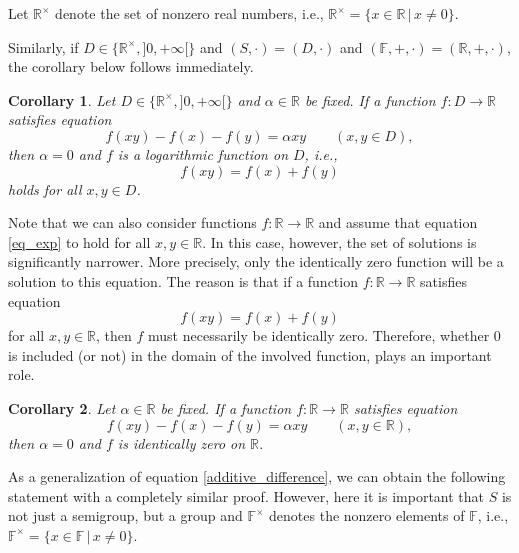 \documentclass[a4paper,12pt]{article}
\theoremstyle{plain}
\newtheorem{cor}{Corollary}
\theoremstyle{definition}
\theoremstyle{remark}
\begin{document}
Let $\mathbb{R}^{\times}$ denote the set of nonzero real numbers, i.e., 
$\mathbb{R}^{\times}= \{ x\in \mathbb{R}\, \vert \, x\neq 0\}$. 


Similarly, if $D\in \{\mathbb{R}^{\times}, ]0, +\infty[ \}$  and  $(S, \cdot)= (D, \cdot)$ and $(\mathbb{F},+, \cdot)= (\mathbb{R},+, \cdot )$, the corollary below follows immediately. 

\begin{cor}\label{cor_exp_positive}
 Let $D\in \{\mathbb{R}^{\times}, ]0, +\infty[ \}$ and  $\alpha\in \mathbb{R}$ be fixed. If a function $f\colon D\to \mathbb{R}$ satisfies equation 
 \begin{equation}\label{eq_exp}
  f(xy)-f(x)-f(y)= \alpha xy
  \qquad 
  (x, y \in D), 
 \end{equation}
 then $\alpha=0$ and $f$ is a logarithmic function on $D$, i.e., 
\[
 f(xy)= f(x)+f(y)
\]
holds for all $x, y\in D$. 
\end{cor}

Note that we can also consider functions $f\colon \mathbb{R}\to \mathbb{R}$ and assume that equation \eqref{eq_exp} to hold for all $x, y\in \mathbb{R}$. 
In this case, however, the set of solutions is significantly narrower. More precisely, only the identically zero function will be a solution to this equation. The reason is that if a function $f\colon \mathbb{R}\to \mathbb{R}$ satisfies  equation
\[
 f(xy)= f(x)+f(y)
\]
for all $x, y\in \mathbb{R}$, then $f$ must necessarily be identically zero. Therefore, whether $0$ is included (or not) in the domain of the involved function, plays an important role.

\begin{cor}\label{cor_exp_real}
 Let $\alpha\in \mathbb{R}$ be fixed. If a function $f\colon \mathbb{R}\to \mathbb{R}$ satisfies equation 
 \begin{equation}\label{eq_exp_real}
  f(xy)-f(x)-f(y)= \alpha xy
  \qquad 
  (x, y \in \mathbb{R}), 
 \end{equation}
 then $\alpha=0$ and $f$ is identically zero on $\mathbb{R}$. 
\end{cor}





As a generalization of equation \eqref{additive_difference}, we can obtain the following statement with a completely similar proof. However, here it is important that $S$ is not just a semigroup, but a group and $\mathbb{F}^{\times}$ denotes the nonzero elements of  $\mathbb{F}$, i.e., 
$\mathbb{F}^{\times}= \{ x\in \mathbb{F}\, \vert \, x\neq 0\}$. 
\end{document}
